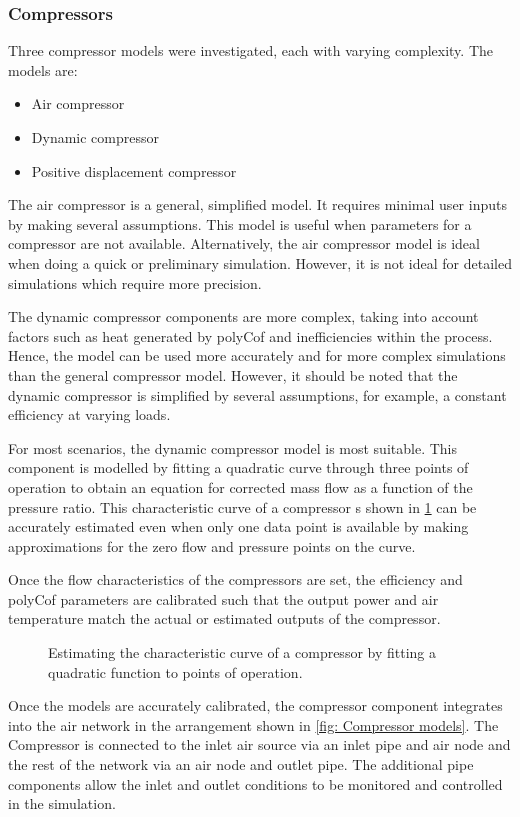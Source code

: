 		\subsubsection{Compressors}
		Three compressor models were investigated, each with varying complexity. The models are:
		\begin{itemize}
			\item Air compressor
			\item Dynamic compressor 
			\item Positive displacement compressor
		\end{itemize} 
		The air compressor is a general, simplified model. It requires minimal user inputs by making several assumptions. This model is useful when parameters for a compressor are not available. Alternatively, the air compressor model is ideal when doing a quick or preliminary simulation. However, it is not ideal for detailed simulations which require more precision.
		\par 
		The dynamic compressor components are more complex, taking into account factors such as heat generated by \gls{polyCof} and inefficiencies within the process. Hence, the model can be used more accurately and for more complex simulations than the general compressor model. However, it should be noted that the dynamic compressor is simplified by several assumptions, for example, a constant efficiency at varying loads. 
		\par 	 
		For most scenarios, the dynamic compressor model is most suitable. This component is modelled by fitting a quadratic curve through three points of operation to obtain an equation for corrected mass flow as a function of the pressure ratio. This characteristic curve of a compressor s shown in \cref{fig: Compressor Curve} can be accurately estimated even when only one data point is available by making approximations for the zero flow and pressure points on the curve.
		\par
		 Once the flow characteristics of the compressors are set, the efficiency and \gls{polyCof} parameters are calibrated such that the output power and air temperature match the actual or estimated outputs of the compressor.
		\begin{figure}[h]
			\centering
			\fbox{}
			\caption{Estimating the characteristic curve of a compressor by fitting a quadratic function to points of operation.}
			\label{fig: Compressor Curve}
		\end{figure}
		Once the models are accurately calibrated, the compressor component integrates into the air network in the arrangement shown in \cref{fig: Compressor models}. The Compressor is connected to the inlet air source via an inlet pipe and air node and the rest of the network via an air node and outlet pipe. The additional pipe components allow the inlet and outlet conditions to be monitored and controlled in the simulation.
